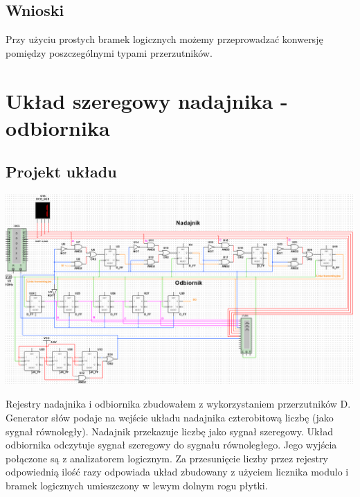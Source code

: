\documentclass{article}
\begin{document}
            
        \subsection{Wnioski}
            Przy użyciu prostych bramek logicznych możemy przeprowadzać konwersję pomiędzy poszczególnymi typami przerzutników.
    
    \section{Układ szeregowy nadajnika - odbiornika}
        \subsection{Projekt układu}
            \begin{center}
                \includegraphics[width=18cm]{reports/img/Z2C_1.png}\\
            \end{center}
            Rejestry nadajnika i odbiornika zbudowałem z wykorzystaniem przerzutników D. Generator słów podaje na wejście układu nadajnika czterobitową liczbę (jako sygnał równoległy). Nadajnik przekazuje liczbę jako sygnał szeregowy. Układ odbiornika odczytuje sygnał szeregowy do sygnału równoległego. Jego wyjścia połączone są z analizatorem logicznym. Za przesunięcie liczby przez rejestry odpowiednią ilość razy odpowiada układ zbudowany z użyciem licznika modulo i bramek logicznych umieszczony w lewym dolnym rogu płytki. 
            
\end{document}

